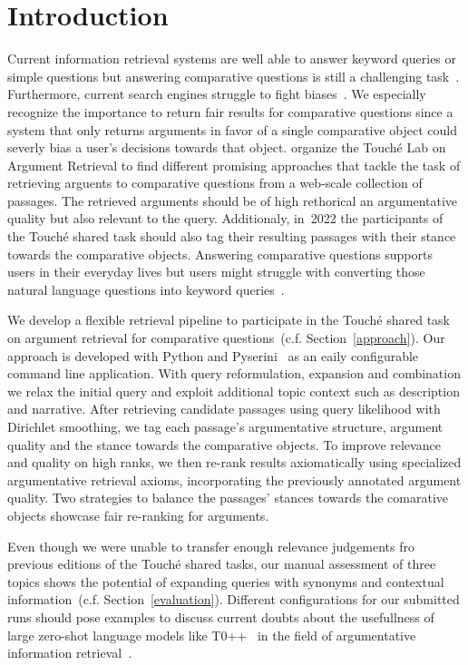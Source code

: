 \section{Introduction}\label{intro}

Current information retrieval systems are well able to answer keyword queries or simple questions but answering comparative questions is still a challenging task~\cite{BondarenkoGFBAPBSWPH2021}.
Furthermore, current search engines struggle to fight biases~\cite{ShahB2022}.
We especially recognize the importance to return fair results for comparative questions since a system that only returns arguments in favor of a single comparative object could severly bias a user's decisions towards that object.
\citet{BondarenkoFKSGBPBSWPH2022} organize the Touché Lab on Argument Retrieval to find different promising approaches that tackle the task of retrieving arguents to comparative questions from a web-scale collection of passages.
The retrieved arguments should be of high rethorical an argumentative quality but also relevant to the query.
Additionaly, in~2022 the participants of the Touché shared task should also tag their resulting passages with their stance towards the comparative objects.
Answering comparative questions supports users in their everyday lives but users might struggle with converting those natural language questions into keyword queries~\cite{BondarenkoGFBAPBSWPH2021}.

We develop a flexible retrieval pipeline to participate in the Touché shared task on argument retrieval for comparative questions~(c.f. Section~\ref{approach}).
Our approach is developed with Python and Pyserini~\cite{LinMLYPN2021} as an eaily configurable command line application.
With query reformulation, expansion and combination we relax the initial query and exploit additional topic context such as description and narrative.
After retrieving candidate passages using query likelihood with Dirichlet smoothing, we tag each passage's argumentative structure, argument quality and the stance towards the comparative objects.
To improve relevance and quality on high ranks, we then re-rank results axiomatically using specialized argumentative retrieval axioms, incorporating the previously annotated argument quality.
Two strategies to balance the passages' stances towards the comarative objects showcase fair re-ranking for arguments.

Even though we were unable to transfer enough relevance judgements fro previous editions of the Touché shared tasks, our manual assessment of three topics shows the potential of expanding queries with synonyms and contextual information~(c.f. Section~\ref{evaluation}).
Different configurations for our submitted runs should pose examples to discuss current doubts about the usefullness of large zero-shot language models like T0++~\cite{SanhWRBSACSLRDBXTSSKCNDCJWMSYPBWNRSSFFTBGBWR2021} in the field of argumentative information retrieval~\cite{ShahB2022}.
